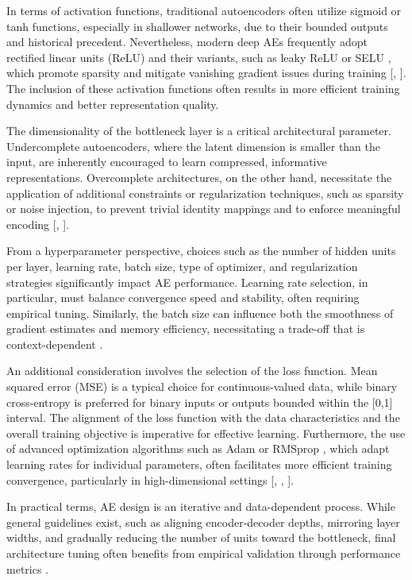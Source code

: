 In terms of activation functions, traditional autoencoders often utilize sigmoid or tanh functions, especially in shallower networks, due to their bounded outputs and historical precedent. Nevertheless, modern deep AEs frequently adopt rectified linear units (ReLU) \cite{ReLU} and their variants, such as leaky ReLU \cite{leakyReLU} or SELU \cite{SELU}, which promote sparsity and mitigate vanishing gradient issues during training [\cite{Charte18}, \cite{Berahmand24}]. The inclusion of these activation functions often results in more efficient training dynamics and better representation quality.

The dimensionality of the bottleneck layer is a critical architectural parameter. Undercomplete autoencoders, where the latent dimension is smaller than the input, are inherently encouraged to learn compressed, informative representations. Overcomplete architectures, on the other hand, necessitate the application of additional constraints or regularization techniques, such as sparsity or noise injection, to prevent trivial identity mappings and to enforce meaningful encoding [\cite{Goodfellow16}, \cite{Charte18}].

From a hyperparameter perspective, choices such as the number of hidden units per layer, learning rate, batch size, type of optimizer, and regularization strategies significantly impact AE performance. Learning rate selection, in particular, must balance convergence speed and stability, often requiring empirical tuning. Similarly, the batch size can influence both the smoothness of gradient estimates and memory efficiency, necessitating a trade-off that is context-dependent \cite{Berahmand24}.

An additional consideration involves the selection of the loss function. Mean squared error (MSE) is a typical choice for continuous-valued data, while binary cross-entropy is preferred for binary inputs or outputs bounded within the [0,1] interval. The alignment of the loss function with the data characteristics and the overall training objective is imperative for effective learning. Furthermore, the use of advanced optimization algorithms such as Adam \cite{Adam} or RMSprop \cite{RMSProp}, which adapt learning rates for individual parameters, often facilitates more efficient training convergence, particularly in high-dimensional settings [\cite{Goodfellow16}, \cite{Charte18}, \cite{Berahmand24}].

In practical terms, AE design is an iterative and data-dependent process. While general guidelines exist, such as aligning encoder-decoder depths, mirroring layer widths, and gradually reducing the number of units toward the bottleneck, final architecture tuning often benefits from empirical validation through performance metrics \cite{Charte18}.


